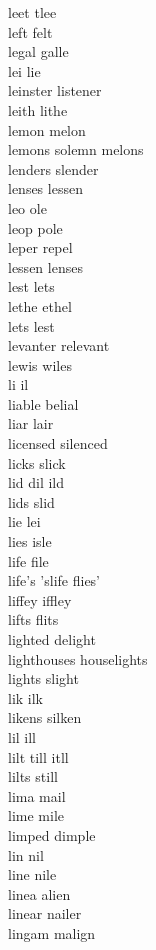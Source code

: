 leet tlee\\
left felt\\
legal galle\\
lei lie\\
leinster listener\\
leith lithe\\
lemon melon\\
lemons solemn melons\\
lenders slender\\
lenses lessen\\
leo ole\\
leop pole\\
leper repel\\
lessen lenses\\
lest lets\\
lethe ethel\\
lets lest\\
levanter relevant\\
lewis wiles\\
li il\\
liable belial\\
liar lair\\
licensed silenced\\
licks slick\\
lid dil ild\\
lids slid\\
lie lei\\
lies isle\\
life file\\
life's 'slife flies'\\
liffey iffley\\
lifts flits\\
lighted delight\\
lighthouses houselights\\
lights slight\\
lik ilk\\
likens silken\\
lil ill\\
lilt till itll\\
lilts still\\
lima mail\\
lime mile\\
limped dimple\\
lin nil\\
line nile\\
linea alien\\
linear nailer\\
lingam malign\\
